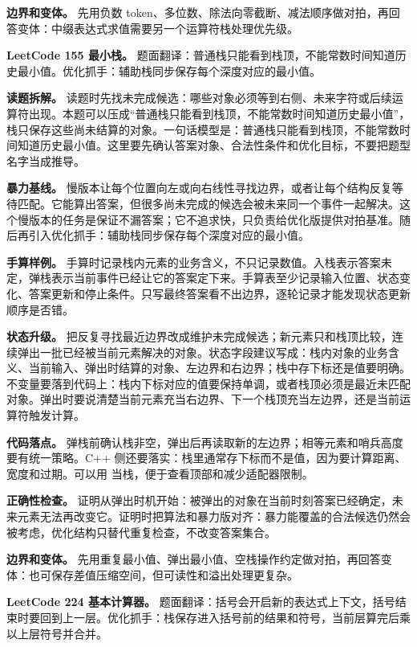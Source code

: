 \textbf{边界和变体。} 先用负数 token、多位数、除法向零截断、减法顺序做对拍，再回答变体：中缀表达式求值需要另一个运算符栈处理优先级。

\noindent\textbf{LeetCode 155 最小栈。} 题面翻译：普通栈只能看到栈顶，不能常数时间知道历史最小值。优化抓手：辅助栈同步保存每个深度对应的最小值。

\textbf{读题拆解。} 读题时先找未完成候选：哪些对象必须等到右侧、未来字符或后续运算符出现。本题可以压成“普通栈只能看到栈顶，不能常数时间知道历史最小值”，栈只保存这些尚未结算的对象。一句话模型是：普通栈只能看到栈顶，不能常数时间知道历史最小值。这里要先确认答案对象、合法性条件和优化目标，不要把题型名字当成推导。

\textbf{暴力基线。} 慢版本让每个位置向左或向右线性寻找边界，或者让每个结构反复等待匹配。它能算出答案，但很多尚未完成的候选会被未来同一个事件一起解决。这个慢版本的任务是保证不漏答案；它不追求快，只负责给优化版提供对拍基准。随后再引入优化抓手：辅助栈同步保存每个深度对应的最小值。

\textbf{手算样例。} 手算时记录栈内元素的业务含义，不只记录数值。入栈表示答案未定，弹栈表示当前事件已经让它的答案定下来。手算表至少记录输入位置、状态变化、答案更新和停止条件。只写最终答案看不出边界，逐轮记录才能发现状态更新顺序是否错。

\textbf{状态升级。} 把反复寻找最近边界改成维护未完成候选；新元素只和栈顶比较，连续弹出一批已经被当前元素解决的对象。状态字段建议写成：栈内对象的业务含义、当前输入、弹出时结算的对象、左边界和右边界；栈中存下标还是值要明确。不变量要落到代码上：栈内下标对应的值要保持单调，或者栈顶必须是最近未匹配对象。弹出时要说清楚当前元素充当右边界、下一个栈顶充当左边界，还是当前运算符触发计算。

\textbf{代码落点。} 弹栈前确认栈非空，弹出后再读取新的左边界；相等元素和哨兵高度要有统一策略。C++ 侧还要落实：栈里通常存下标而不是值，因为要计算距离、宽度和过期。可以用  当栈，便于查看顶部和减少适配器限制。

\textbf{正确性检查。} 证明从弹出时机开始：被弹出的对象在当前时刻答案已经确定，未来元素无法再改变它。证明时把算法和暴力版对齐：暴力能覆盖的合法候选仍然会被考虑，优化结构只替代重复检查，不改变答案集合。

\textbf{边界和变体。} 先用重复最小值、弹出最小值、空栈操作约定做对拍，再回答变体：也可保存差值压缩空间，但可读性和溢出处理更复杂。

\noindent\textbf{LeetCode 224 基本计算器。} 题面翻译：括号会开启新的表达式上下文，括号结束时要回到上一层。优化抓手：栈保存进入括号前的结果和符号，当前层算完后乘以上层符号并合并。

